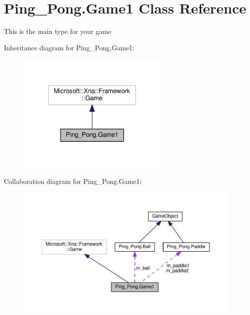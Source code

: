 \hypertarget{class_ping___pong_1_1_game1}{\section{Ping\-\_\-\-Pong.\-Game1 Class Reference}
\label{class_ping___pong_1_1_game1}
}


This is the main type for your game  




Inheritance diagram for Ping\-\_\-\-Pong.\-Game1\-:\nopagebreak
\begin{figure}[H]
\begin{center}
\leavevmode
\includegraphics[width=214pt]{class_ping___pong_1_1_game1__inherit__graph}
\end{center}
\end{figure}


Collaboration diagram for Ping\-\_\-\-Pong.\-Game1\-:\nopagebreak
\begin{figure}[H]
\begin{center}
\leavevmode
\includegraphics[width=350pt]{class_ping___pong_1_1_game1__coll__graph}
\end{center}
\end{figure}
